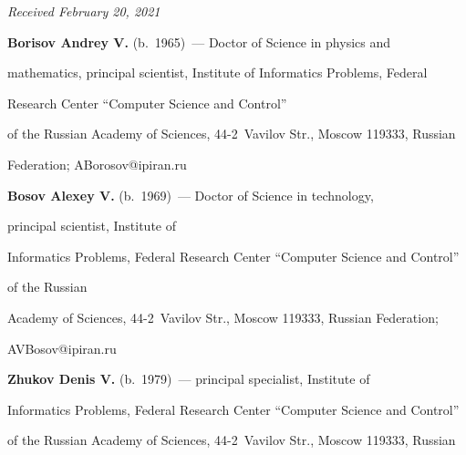 \hfill{\small\textit{Received February 20, 2021}}










\Contr





\noindent


\textbf{Borisov Andrey V.} (b.\ 1965)~--- Doctor of Science in physics and 


mathematics, principal scientist, Institute of Informatics Problems, Federal 


Research Center ``Computer Science and Control''  


of the Russian Academy of Sciences, 44-2~Vavilov Str., Moscow 119333, Russian 


Federation; \mbox{ABorosov@ipiran.ru}





\vspace*{3pt}





\noindent


\textbf{Bosov Alexey V.} (b.\ 1969)~--- Doctor of Science in technology, 


principal scientist, Institute of


Informatics Problems, Federal Research Center ``Computer Science and Control'' 


of the Russian


Academy of Sciences, 44-2~Vavilov Str., Moscow 119333, Russian Federation;


\mbox{AVBosov@ipiran.ru}





\vspace*{3pt}





\noindent


\textbf{Zhukov Denis V.} (b.\ 1979)~--- principal specialist, Institute of 


Informatics Problems, Federal Research Center ``Computer Science and Control'' 


of the Russian Academy of Sciences, 44-2~Vavilov Str., Moscow 119333, Russian 


